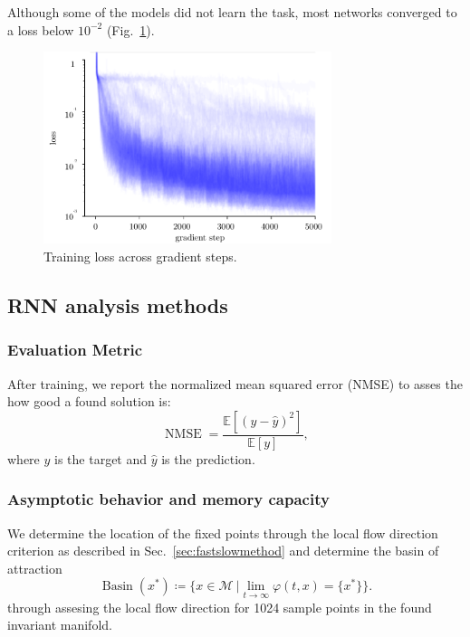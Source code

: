 \documentclass{article} %
\newcounter{ct}
\newcommand{\manifold}{\mathcal{M}}
\DeclareMathOperator{\basin}{Basin}
\theoremstyle{definition}
\theoremstyle{remark}
\begin{document}
Although some of the models did not learn the task, most networks converged to a loss below \(10^{-2}\) (Fig.~\ref{fig:training_losses}).
 \begin{figure}[tbhp]
     \centering
    \includegraphics[width=0.75\textwidth]{training_losses_s}
       \caption{Training loss across gradient steps.}\label{fig:training_losses}
\end{figure}






\newpage
 \subsection{RNN analysis methods}


\subsubsection{Evaluation Metric}
After training, we report the normalized mean squared error (NMSE) to asses the how good a found solution is:
\begin{equation}
\operatorname{NMSE} = \frac{\mathbb{E}[(y-\hat y)^{2}]}{\mathbb{E}[y]},
\end{equation}where \(y\) is the target and \(\hat y\) is the prediction.


\subsubsection{Asymptotic behavior and memory capacity}\label{sec:supp:asymbehav}
We determine the location of the fixed points through the local flow direction criterion as described in Sec.~\ref{sec:fastslowmethod}
and determine the basin of attraction
\begin{equation}
\basin(x^*) \coloneqq \{x\in \manifold \ | \lim_{t\rightarrow\infty}\varphi(t, x)=\{x^*\}\}.
\end{equation}through assesing the local flow direction for 1024 sample points in the found invariant manifold.
\end{document}
